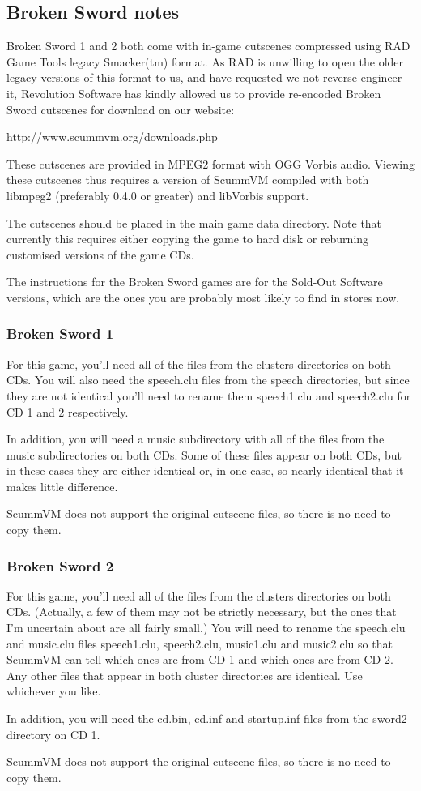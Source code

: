 


\subsection {Broken Sword notes}
Broken Sword 1 and 2 both come with in-game cutscenes compressed using
RAD Game Tools legacy Smacker(tm) format. As RAD is unwilling to open
the older legacy versions of this format to us, and have requested we not
reverse engineer it, Revolution Software has kindly allowed us to provide
re-encoded Broken Sword cutscenes for download on our website:

  http://www.scummvm.org/downloads.php

These cutscenes are provided in MPEG2 format with OGG Vorbis audio.
Viewing these cutscenes thus requires a version of ScummVM compiled
with both libmpeg2 (preferably 0.4.0 or greater) and libVorbis support.

The cutscenes should be placed in the main game data directory. Note that
currently this requires either copying the game to hard disk or reburning
customised versions of the game CDs.

The instructions for the Broken Sword games are for the Sold-Out Software
versions, which are the ones you are probably most likely to find in stores
now.

\subsubsection{Broken Sword 1}
For this game, you'll need all of the files from the clusters directories on
both CDs. You will also need the speech.clu files from the speech directories,
but since they are not identical you'll need to rename them speech1.clu and
speech2.clu for CD 1 and 2 respectively.

In addition, you will need a music subdirectory with all of the files from the
music subdirectories on both CDs. Some of these files appear on both CDs, but
in these cases they are either identical or, in one case, so nearly identical
that it makes little difference.

ScummVM does not support the original cutscene files, so there is no need to
copy them.

\subsubsection{Broken Sword 2}
For this game, you'll need all of the files from the clusters directories on
both CDs. (Actually, a few of them may not be strictly necessary, but the ones
that I'm uncertain about are all fairly small.) You will need to rename the
speech.clu and music.clu files speech1.clu, speech2.clu, music1.clu and
music2.clu so that ScummVM can tell which ones are from CD 1 and which ones are
from CD 2. Any other files that appear in both cluster directories are
identical. Use whichever you like.

In addition, you will need the cd.bin, cd.inf and startup.inf files from the
sword2 directory on CD 1.

ScummVM does not support the original cutscene files, so there is no need to
copy them.
